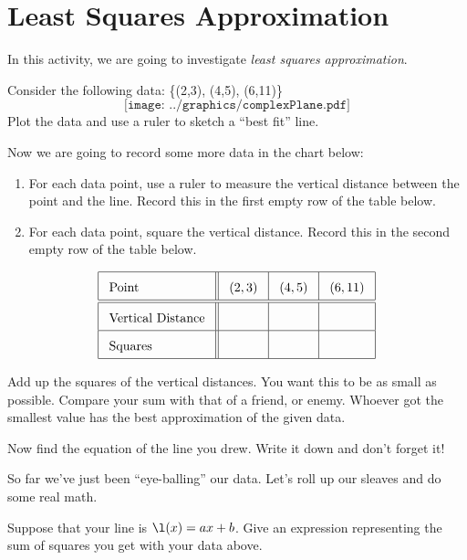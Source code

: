 \newpage
\section{Least Squares Approximation}\label{A:leastSquares}

In this activity, we are going to investigate \textit{least
squares approximation}.

\begin{prob}
Consider the following data:
\{(2,3), (4,5), (6,11)\}
\[
\texttt{[image: ../graphics/complexPlane.pdf]}
\]
Plot the data and use a ruler to sketch a ``best fit'' line.
\end{prob}

\begin{prob}
Now we are going to record some more data in the chart below:
\begin{enumerate}
\item  For each data point, use a ruler to measure the vertical distance between the point and the line. Record this in the first empty row of the table below.
\item For each data point, square the vertical distance. Record this in the second empty row of the table below.
\end{enumerate}
\[
{\renewcommand{\arraystretch}{1.8}
\renewcommand{\arraycolsep}{3mm}
\begin{array}{|l||c|c|c|c|}\hline
\text{Point} & (2,3) & (4,5) & (6,11)  \\ \hline\hline
\text{Vertical Distance} & & & \\ \hline
\text{Squares} & & & \\ \hline
\end{array}}
\]
\end{prob}

\begin{prob}
Add up the squares of the vertical distances. You want this to be as
small as possible. Compare your sum with that of a friend, or enemy.
Whoever got the smallest value has the best approximation of the given data.
\end{prob}

\begin{prob}
Now find the equation of the line you drew. Write it down and don't
forget it!
\end{prob}

So far we've just been ``eye-balling'' our data. Let's roll up our
sleaves and do some real math.

\begin{prob}
Suppose that your line is $\l(x) = ax + b$. Give an expression
representing the sum of squares you get with your data above.
\end{prob}

